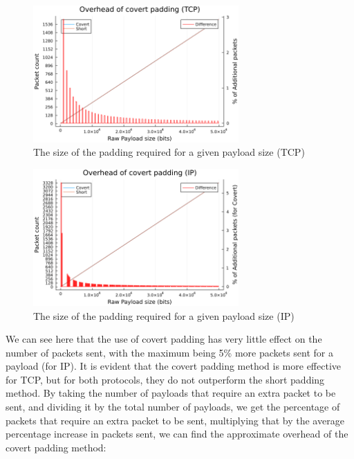 \begin{figure}[h]
    \centering
    \includegraphics[width=0.7\textwidth]{fig/padding_size_TCP.png}
    \caption{The size of the padding required for a given payload size (TCP)}
    \label{fig:padding_size_TCP}
\end{figure}

\begin{figure}[h]
    \centering
    \includegraphics[width=0.7\textwidth]{fig/padding_size_IP.png}
    \caption{The size of the padding required for a given payload size (IP)}
    \label{fig:padding_size_IP}
\end{figure}

We can see here that the use of covert padding has very little effect on the number of packets sent, with the maximum being 5\% more packets sent for a payload (for IP). It is evident that the covert padding method is more effective for TCP, but for both protocols, they do not outperform the short padding method. By taking the number of payloads that require an extra packet to be sent, and dividing it by the total number of payloads, we get the percentage of packets that require an extra packet to be sent, multiplying that by the average percentage increase in packets sent, we can find the approximate overhead of the covert padding method:

